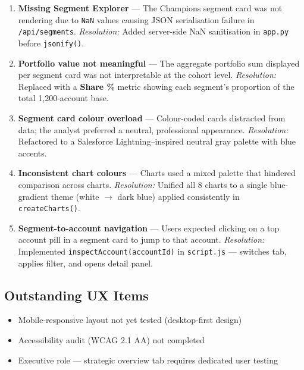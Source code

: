 \documentclass[11pt,a4paper]{article}
\begin{document}
\begin{enumerate}[leftmargin=1.5cm]
  \item \textbf{Missing Segment Explorer} — The Champions segment card was not
    rendering due to \texttt{NaN} values causing JSON serialisation failure in
    \texttt{/api/segments}. \textit{Resolution:} Added server-side NaN
    sanitisation in \texttt{app.py} before \texttt{jsonify()}.

  \item \textbf{Portfolio value not meaningful} — The aggregate portfolio sum
    displayed per segment card was not interpretable at the cohort level.
    \textit{Resolution:} Replaced with a \textbf{Share \%} metric showing each
    segment's proportion of the total 1{,}200-account base.

  \item \textbf{Segment card colour overload} — Colour-coded cards distracted
    from data; the analyst preferred a neutral, professional appearance.
    \textit{Resolution:} Refactored to a Salesforce Lightning–inspired neutral
    gray palette with blue accents.

  \item \textbf{Inconsistent chart colours} — Charts used a mixed palette that
    hindered comparison across charts.
    \textit{Resolution:} Unified all 8 charts to a single blue-gradient theme
    (white $\to$ dark blue) applied consistently in \texttt{createCharts()}.

  \item \textbf{Segment-to-account navigation} — Users expected clicking on a
    top account pill in a segment card to jump to that account.
    \textit{Resolution:} Implemented \texttt{inspectAccount(accountId)} in
    \texttt{script.js} — switches tab, applies filter, and opens detail panel.
\end{enumerate}

\subsection{Outstanding UX Items}

\begin{itemize}[leftmargin=1.5cm, noitemsep]
  \item Mobile-responsive layout not yet tested (desktop-first design)
  \item Accessibility audit (WCAG 2.1 AA) not completed
  \item Executive role — strategic overview tab requires dedicated user testing
\end{itemize}
\end{document}
